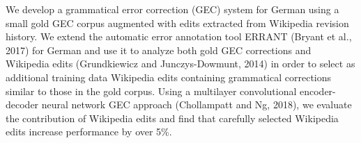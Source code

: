 We develop a grammatical error correction (GEC) system for German using a small gold GEC corpus augmented with edits extracted from Wikipedia revision history. We extend the automatic error annotation tool ERRANT (Bryant et al., 2017) for German and use it to analyze both gold GEC corrections and Wikipedia edits (Grundkiewicz and Junczys-Dowmunt, 2014) in order to select as additional training data Wikipedia edits containing grammatical corrections similar to those in the gold corpus. Using a multilayer convolutional encoder-decoder neural network GEC approach (Chollampatt and Ng, 2018), we evaluate the contribution of Wikipedia edits and find that carefully selected Wikipedia edits increase performance by over 5\%.
